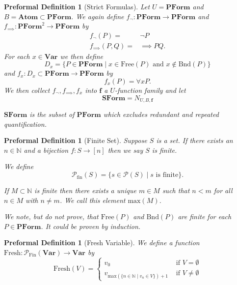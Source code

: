 \documentclass[oneside, 12pt]{book}
\theoremstyle{break}
\newtheorem{preformal definition}[definition]{Preformal Definition}
\newtheorem{preformal theorem}[theorem]{Preformal Theorem}
\newcommand{\bv}[1]{\boldsymbol{#1}}
\newcommand{\mc}[1]{\mathcal{#1}}
\newcommand{\N}[0]{\mathbb{N}}
\begin{document}
		\begin{preformal definition}[Strict Formulas]
			Let $U = \textbf{PForm}$ and $B=\textbf{Atom} \subset \textbf{PForm}$.
			We again define $f_{\lnot}: \textbf{PForm} \to \textbf{PForm}$ and $f_{\implies}: \textbf{PForm}^2 \to \textbf{PForm}$ by
			\begin{align*}
				f_{\lnot}(P) =& \lnot P\\
				f_{\implies}(P, Q) =& \implies PQ.
			\end{align*}
			For each $x\in \textbf{Var}$ we then define
			\begin{equation*}
				D_x = \{P \in \textbf{PForm} \mid x\in \text{Free}(P) \text{ and } x \not \in \text{Bnd}(P)\}
			\end{equation*}
			and $f_x: D_x \subset \textbf{PForm} \to \textbf{PForm}$ by
			\begin{equation*}
				f_x(P) = \forall x P.
			\end{equation*}
			We then collect $f_{\lnot}, f_{\implies}, f_x$ into $\bv{f}$ a $U$-function family and let
			\begin{equation*}
				\textbf{SForm} = N_{U, B, \bv{f}}
			\end{equation*}
			
			$\textbf{SForm}$ is the subset of $\textbf{PForm}$ which excludes redundant and repeated quantification.
		\end{preformal definition}
		
		\begin{preformal definition}[Finite Set]
			Suppose $S$ is a set.
			If there exists an $n\in \N$ and a bijection $f:S \to [n]$ then we say $S$ is finite.
			
			We define
			\begin{equation*}
				\mc{P}_{\text{fin}}(S) = \{s \in \mc{P}(S) \mid s \text{ is finite}\}.
			\end{equation*}
			
			If $M \subset \N$ is finite then there exists a unique $m\in M$ such that $n < m$ for all $n\in M$ with $n\neq m$.
			We call this element $\text{max}(M)$.
			
			We note, but do not prove, that $\text{Free}(P)$ and $\text{Bnd}(P)$ are finite for each $P \in \textbf{PForm}$.
			It could be proven by induction.
		\end{preformal definition}
		
		\begin{preformal definition}[Fresh Variable]
			We define a function $\text{Fresh}: \mc{P}_{\text{Fin}}(\textbf{Var}) \to \textbf{Var}$ by
			\begin{equation*}
				\text{Fresh}(V) = \begin{cases} v_0 &\text{ if } V = \emptyset\\
					v_{\text{max}(\{n \in \N \mid v_n \in V\}) + 1} &\text{ if } V \neq \emptyset
					\end{cases}
			\end{equation*}
		\end{preformal definition}
	
\end{document}
